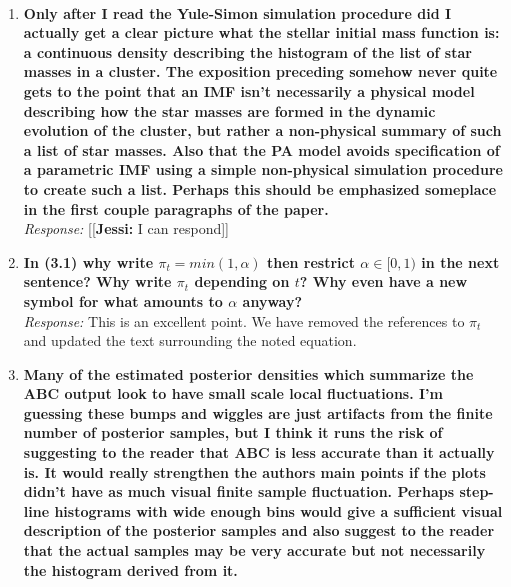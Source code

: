 \documentclass[11pt, oneside]{article}   	%
\newcommand{\jessi}[1]{{\color{blue}[[\textbf{Jessi: }#1]]}}
\begin{document}
\\

\begin{enumerate}
\item {\bf Only after I read the Yule-Simon simulation procedure did I actually get a clear picture what the stellar initial mass function is: a continuous density describing the histogram of the list of star masses in a cluster. The exposition preceding somehow never quite gets to the point that an IMF isn't necessarily a physical model describing how the star masses are formed in the dynamic evolution of the cluster, but rather a non-physical summary of such a list of star masses. Also that the PA model avoids specification of a parametric IMF using a simple non-physical simulation procedure to create such a list. Perhaps this should be emphasized someplace in the first couple paragraphs of the paper.
} \\
\noindent \emph{Response:} \jessi{I can respond}
\bigskip

\item {\bf In (3.1) why write $\pi_t = min(1, \alpha)$  then restrict $\alpha \in [0, 1)$ in the next sentence? Why write $\pi_t$ depending on $t$? Why even have a new symbol for what amounts to $\alpha$ anyway?}\\
\noindent \emph{Response:} This is an excellent point.  We have removed the references to $\pi_t$ and updated the text surrounding the noted equation.
\bigskip

\item {\bf Many of the estimated posterior densities which summarize the ABC output look to have small scale local fluctuations. I'm guessing these bumps and wiggles are just artifacts from the finite number of posterior samples, but I think it runs the risk of suggesting to the reader that ABC is less accurate than it actually is. It would really strengthen the authors main points if the plots didn't have as much visual finite sample fluctuation. Perhaps step-line histograms with wide enough bins would give a sufficient visual description of the posterior samples and also suggest to the reader that the actual samples may be very accurate but not necessarily the histogram derived from it. \\

}
\end{enumerate}
\end{document}
